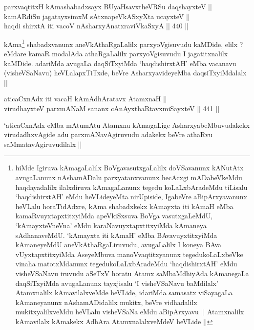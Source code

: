 
\begin{shl}
parxvaqtitxH kAmashabadxsayx BUyaHsavxtheVRSu daqshayxteV || \\
kamARdiSu jagatayxsimxM sAtxnapeVkASxyXta ucayxteV || \\
haqdi shirxtA iti vacoV nA\s \s sharxyAnatxraviVkaSxyA ||  440 ||  
\end{shl}

\begin{artha}
kAma\footnote{hiMde Igiruva kAmagaLalilx BoVgavasutxgaLalilx
  doVSavanunx kANutAtx avugaLanunx nAshamADalu parxyatanxvanunx
  hecAcxgi mADabeVkeMdu haqdayadalilx ilalxdiruva kAmagaLanunx tegedu
  koLaLxbAradeMdu tiLisalu `haqdishirxtAH' eMdu heVLideyeMta
  nirUpiside, IgabeVre aBipArxyavanunx heVLalu horaTidAdxre, kAma
  shabadxkekx kAmayxta iti kAmaH eMba kamaRvuyxtapxtitxyiMda
  apeVkiSxsuva BoVga vasutxgaLeMdU, `kAmayxteV\s neVna' eMdu
  karaNavuyxtapxtitxyiMda kAmaneya sAdhanaveMdU. `kAmayxta iti kAmaH'
  eMba BAvavuyxtitxyiMda kAmaneyeMdU aneVkAthaRgaLiruvudu, avugaLalilx
  I koneya BAva vUyxtapxtitxyiMda AseyeMbuva manoVvaqtitxyanunx
  tegedukoLaLxbeVke vinaha matotxMdanunx tegedukoLaLxbAradeMdu
  `haqdishirxtAH' eMdu visheVSaNavu iruvudu aSeTxV horatu Atamx
  saMbaMdhiyAda kAmanegaLa daqSiTxyiMda avugaLanunx tayxjisalu `I
  visheVSaNavu baMdilalx' Atamxnalilx kAmavilalxveMde heVLide,
  idariMda samasatx viSayagaLa kAmaneyanunx nAshamADidalilx mukitx,
  beVre vidhadalilx mukitxyalilxveMdu heVLalu visheVSaNa eMdu
  aBipArxyavu || Atamxnalilx kAmavilalx kAmakekx AdhAra
  AtamxnalalxveMdeV heVLide ||} shabadxvanunx aneVkAthaRgaLalilx parxyoVgisuvudu
kaMDide, elilx ? eMdare kamaR modalAda athaRgaLalilx parxyoVgisuvudu I
jagatitxnalilx kaMDide. adariMda avugaLa daqSiTxyiMda `haqdishirxtAH'
eMba vacanavu (visheVSaNavu) heVLalapxTiTxde, beVre AsharxyavideyeMba
daqsiTxyiMdalalx ||
\end{artha}


\begin{shl}
aticaCxnAdx iti vacaH kAmAdhAratavx AtamxnaH || \\
virudhayxteV parxmANaM sananx cAnAyxthaRtavxmiSayxteV ||  441 ||  
\end{shl}

\begin{artha}
`aticaCxnAdx eMba mAtumAtu Atamxnu kAmagaLige AsharxyabeMbuvudakekx
  virudadhxvAgide adu parxmANavAgiruvudu adakekx beVre athaRvu
  saMmatavAgiruvudilalx ||
\end{artha}

